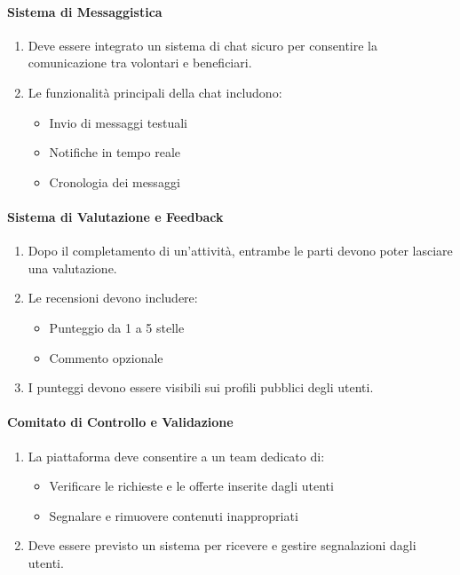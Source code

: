 \paragraph{Sistema di Messaggistica}

\begin{enumerate}
    \item Deve essere integrato un sistema di chat sicuro per consentire la comunicazione tra volontari e beneficiari.
    
    \item Le funzionalità principali della chat includono:
    \begin{itemize}
        \item Invio di messaggi testuali
        \item Notifiche in tempo reale
        \item Cronologia dei messaggi
    \end{itemize}
\end{enumerate}

\paragraph{Sistema di Valutazione e Feedback}

\begin{enumerate}
    \item Dopo il completamento di un'attività, entrambe le parti devono poter lasciare una valutazione.
    
    \item Le recensioni devono includere:
    \begin{itemize}
        \item Punteggio da 1 a 5 stelle
        \item Commento opzionale
    \end{itemize}
    
    \item I punteggi devono essere visibili sui profili pubblici degli utenti.
\end{enumerate}

\paragraph{Comitato di Controllo e Validazione}

\begin{enumerate}
    \item La piattaforma deve consentire a un team dedicato di:
    \begin{itemize}
        \item Verificare le richieste e le offerte inserite dagli utenti
        \item Segnalare e rimuovere contenuti inappropriati
    \end{itemize}
    
    \item Deve essere previsto un sistema per ricevere e gestire segnalazioni dagli utenti.
\end{enumerate}

